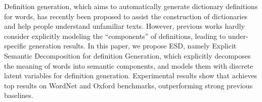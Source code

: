 Definition generation, which aims to automatically generate dictionary definitions for words, has recently been proposed to assist the construction of dictionaries and help people understand unfamiliar texts. However, previous works hardly consider explicitly modeling the ``components'' of definitions, leading to under-specific generation results. In this paper, we propose ESD, namely Explicit Semantic Decomposition for definition Generation, which explicitly decomposes the meaning of words into semantic components, and models them with discrete latent variables for definition generation. Experimental results show that \method achieves top results on WordNet and Oxford benchmarks, outperforming strong previous baselines.
